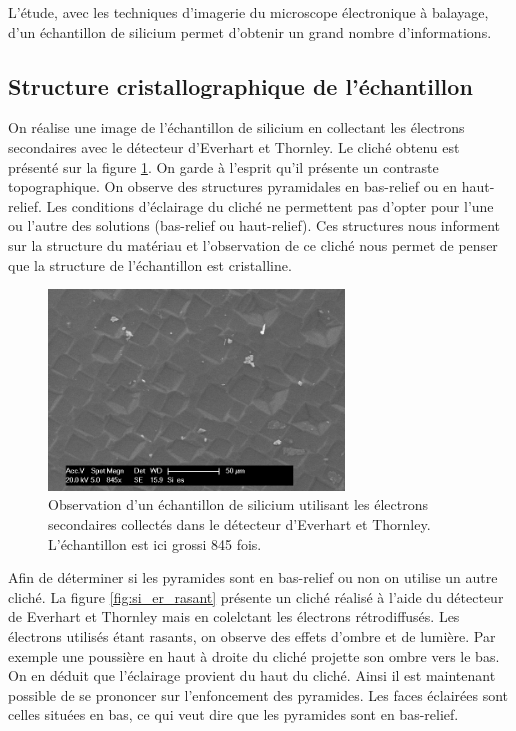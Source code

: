 \documentclass[a4paper,12pt]{article}
\newcommand\ett{Everhart et Thornley\xspace}
\begin{document}
L'étude, avec les techniques d'imagerie du microscope électronique à balayage, d'un échantillon de silicium permet d'obtenir un grand nombre d'informations.

\subsection{Structure cristallographique de l'échantillon}

On réalise une image de l'échantillon de silicium en collectant les électrons secondaires avec le détecteur d'\ett.
Le cliché obtenu est présenté sur la figure \ref{fig:si_es}. On garde à l'esprit qu'il présente un contraste topographique.
On observe des structures pyramidales en bas-relief ou en haut-relief. Les conditions d'éclairage du cliché ne permettent
pas d'opter pour l'une ou l'autre des solutions (bas-relief ou haut-relief). Ces structures nous informent sur la structure
du matériau et l'observation de ce cliché nous permet de penser que la structure de l'échantillon est cristalline.



\begin{figure}
\centering
\includegraphics[width=0.7\textwidth]{images/si_es.png}
\caption{Observation d'un échantillon de silicium utilisant les électrons secondaires collectés dans le détecteur d'\ett. L'échantillon est ici grossi 845 fois.}
\label{fig:si_es}
\end{figure}

Afin de déterminer si les pyramides sont en bas-relief ou non on utilise un autre cliché. La figure \ref{fig:si_er_rasant} présente
un cliché réalisé à l'aide du détecteur de \ett mais en colelctant les électrons rétrodiffusés. Les électrons utilisés étant rasants,
on observe des effets d'ombre et de lumière. Par exemple une poussière en haut à droite du cliché projette son ombre vers le bas.
On en déduit que l'éclairage provient du haut du cliché. Ainsi il est maintenant possible de se prononcer sur l'enfoncement des pyramides.
Les faces éclairées sont celles situées en bas, ce qui veut dire que les pyramides sont en bas-relief.
\end{document}
